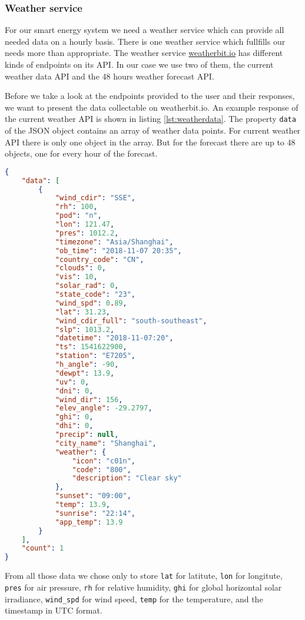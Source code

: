 \subsubsection{Weather service}\label{sec:weatherservice}
For our smart energy system we need a weather service which can provide all needed data on a hourly basis.
There is one weather service which fullfills our needs more than appropriate.
The weather service \url{weatherbit.io} has different kinds of endpoints on its API.
In our case we use two of them, the current weather data API and the 48 hours weather forecast API.

Before we take a look at the endpoints provided to the user and their responses, we want to present the data collectable on weatherbit.io.
An example response of the current weather API is shown in listing \ref{lst:weatherdata}.
The property  \texttt{data} of the JSON object contains an array of weather data points.
For current weather API there is only one object in the array.
But for the forecast there are up to 48 objects, one for every hour of the forecast.
\begin{lstlisting}[caption={Example response of weatherbit.io for $lat=31.23$ and $lon=121.47$}, label={lst:weatherdata}, frame=single, language=json]
 {
    "data": [
        {
            "wind_cdir": "SSE",
            "rh": 100,
            "pod": "n",
            "lon": 121.47,
            "pres": 1012.2,
            "timezone": "Asia/Shanghai",
            "ob_time": "2018-11-07 20:35",
            "country_code": "CN",
            "clouds": 0,
            "vis": 10,
            "solar_rad": 0,
            "state_code": "23",
            "wind_spd": 0.89,
            "lat": 31.23,
            "wind_cdir_full": "south-southeast",
            "slp": 1013.2,
            "datetime": "2018-11-07:20",
            "ts": 1541622900,
            "station": "E7205",
            "h_angle": -90,
            "dewpt": 13.9,
            "uv": 0,
            "dni": 0,
            "wind_dir": 156,
            "elev_angle": -29.2797,
            "ghi": 0,
            "dhi": 0,
            "precip": null,
            "city_name": "Shanghai",
            "weather": {
                "icon": "c01n",
                "code": "800",
                "description": "Clear sky"
            },
            "sunset": "09:00",
            "temp": 13.9,
            "sunrise": "22:14",
            "app_temp": 13.9
        }
    ],
    "count": 1
}
\end{lstlisting}
From all those data we chose only to store \texttt{lat} for latitute, \texttt{lon} for longitute, \texttt{pres} for air pressure, \texttt{rh} for relative humidity, \texttt{ghi} for global horizontal solar irradiance, \texttt{wind\_spd} for wind speed, \texttt{temp} for the temperature, and the timestamp in UTC format.

